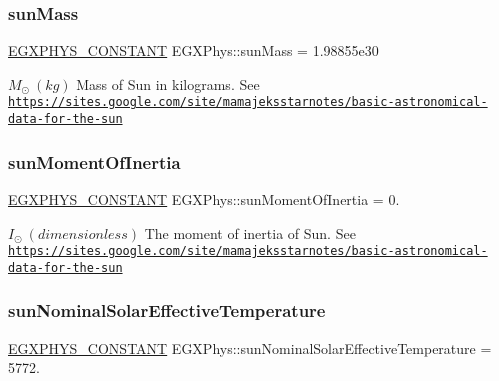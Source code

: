 \subsubsection{\texorpdfstring{sun\+Mass}{sunMass}}
{\footnotesize\ttfamily \mbox{\hyperlink{group___e_g_x_phys-_constants-_macros_ga76980d288494ce1714c9ac68a95ba702}{E\+G\+X\+P\+H\+Y\+S\+\_\+\+C\+O\+N\+S\+T\+A\+NT}} E\+G\+X\+Phys\+::sun\+Mass = 1.\+98855e30}

$M_{\odot} \ (kg)$ Mass of Sun in kilograms. See \href{https://sites.google.com/site/mamajeksstarnotes/basic-astronomical-data-for-the-sun}{\tt https\+://sites.\+google.\+com/site/mamajeksstarnotes/basic-\/astronomical-\/data-\/for-\/the-\/sun} \mbox{\label{group___e_g_x_phys-_constants-_astrophysics-_solar_system-_sun-_bulk_gaac9b36e0707bb136df37facc3629400a}} 
\subsubsection{\texorpdfstring{sun\+Moment\+Of\+Inertia}{sunMomentOfInertia}}
{\footnotesize\ttfamily \mbox{\hyperlink{group___e_g_x_phys-_constants-_macros_ga76980d288494ce1714c9ac68a95ba702}{E\+G\+X\+P\+H\+Y\+S\+\_\+\+C\+O\+N\+S\+T\+A\+NT}} E\+G\+X\+Phys\+::sun\+Moment\+Of\+Inertia = 0.}

$ I_{\odot} \ (dimensionless)$ The moment of inertia of Sun. See \href{https://sites.google.com/site/mamajeksstarnotes/basic-astronomical-data-for-the-sun}{\tt https\+://sites.\+google.\+com/site/mamajeksstarnotes/basic-\/astronomical-\/data-\/for-\/the-\/sun} \mbox{\label{group___e_g_x_phys-_constants-_astrophysics-_solar_system-_sun-_bulk_ga02d8f3c8e91bba017bcc609a4c743ae5}} 
\subsubsection{\texorpdfstring{sun\+Nominal\+Solar\+Effective\+Temperature}{sunNominalSolarEffectiveTemperature}}
{\footnotesize\ttfamily \mbox{\hyperlink{group___e_g_x_phys-_constants-_macros_ga76980d288494ce1714c9ac68a95ba702}{E\+G\+X\+P\+H\+Y\+S\+\_\+\+C\+O\+N\+S\+T\+A\+NT}} E\+G\+X\+Phys\+::sun\+Nominal\+Solar\+Effective\+Temperature = 5772.}

